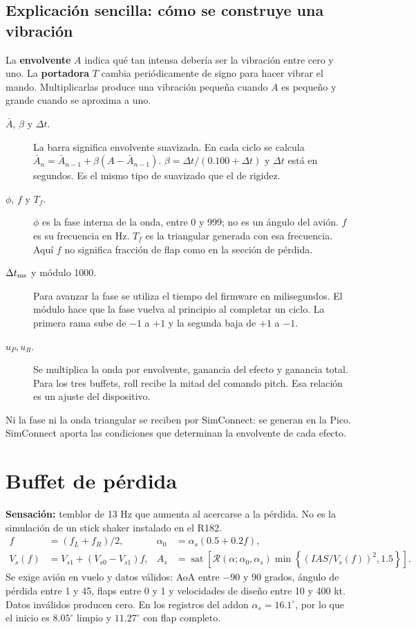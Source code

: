 \documentclass[11pt,a4paper]{article}
\newcommand{\sat}{\operatorname{sat}}
\begin{document}
\subsection{Explicación sencilla: cómo se construye una vibración}
La \textbf{envolvente} $A$ indica qué tan intensa debería ser la vibración entre cero y uno. La \textbf{portadora} $T$ cambia periódicamente de signo para hacer vibrar el mando. Multiplicarlas produce una vibración pequeña cuando $A$ es pequeño y grande cuando se aproxima a uno.
\begin{description}
\item[$\bar A$, $\beta$ y $\Delta t$.] La barra significa envolvente suavizada. En cada ciclo se calcula $\bar A_n=\bar A_{n-1}+\beta(A-\bar A_{n-1})$. $\beta=\Delta t/(0.100+\Delta t)$ y $\Delta t$ está en segundos. Es el mismo tipo de suavizado que el de rigidez.
\item[$\phi$, $f$ y $T_f$.] $\phi$ es la fase interna de la onda, entre 0 y 999; no es un ángulo del avión. $f$ es su frecuencia en Hz. $T_f$ es la triangular generada con esa frecuencia. Aquí $f$ no significa fracción de flap como en la sección de pérdida.
\item[$\Delta t_{\rm ms}$ y módulo 1000.] Para avanzar la fase se utiliza el tiempo del firmware en milisegundos. El módulo hace que la fase vuelva al principio al completar un ciclo. La primera rama sube de $-1$ a $+1$ y la segunda baja de $+1$ a $-1$.
\item[$u_P,u_R$.] Se multiplica la onda por envolvente, ganancia del efecto y ganancia total. Para los tres buffets, roll recibe la mitad del comando pitch. Esa relación es un ajuste del dispositivo.
\end{description}
Ni la fase ni la onda triangular se reciben por SimConnect: se generan en la Pico. SimConnect aporta las condiciones que determinan la envolvente de cada efecto.

\section{Buffet de pérdida}
\textbf{Sensación:} temblor de 13 Hz que aumenta al acercarse a la pérdida. No es la simulación de un stick shaker instalado en el R182.
\begin{align}
 f&=(f_L+f_R)/2,&\alpha_0&=\alpha_s(0.5+0.2f),\\
 V_s(f)&=V_{s1}+(V_{s0}-V_{s1})f,&
 A_s&=\sat\left[\mathcal R(\alpha;\alpha_0,\alpha_s)\min\left\{(IAS/V_s(f))^2,1.5\right\}\right].
\end{align}
Se exige avión en vuelo y datos válidos: AoA entre $-90$ y $90$ grados, ángulo de pérdida entre 1 y 45, flaps entre 0 y 1 y velocidades de diseño entre 10 y 400 kt. Datos inválidos producen cero. En los registros del addon $\alpha_s=16.1^\circ$, por lo que el inicio es $8.05^\circ$ limpio y $11.27^\circ$ con flap completo.
\end{document}
